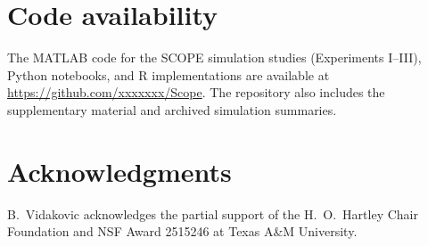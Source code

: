 \documentclass[12pt]{article}
\theoremstyle{definition}
\theoremstyle{definition}
\begin{document}
\section*{Code availability}

The MATLAB code for the SCOPE simulation studies (Experiments I--III),
Python notebooks, and R implementations are available at
\url{https://github.com/xxxxxxx/Scope}. The repository also includes
the supplementary material and archived simulation summaries.

\section*{Acknowledgments}

B.~Vidakovic acknowledges the partial support of the H.~O.~Hartley
Chair Foundation and NSF Award 2515246 at Texas A\&M University.



\end{document}
